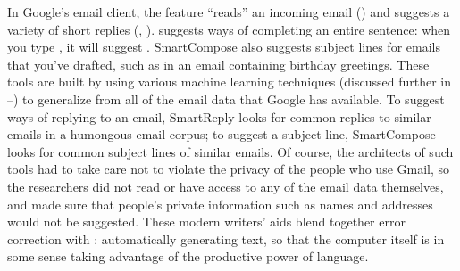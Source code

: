 In Google's email client, the  feature ``reads'' an incoming email () and suggests a variety of short replies (, ).   suggests ways of completing an entire sentence: when you type , it will suggest .  SmartCompose also suggests subject lines for emails that you've drafted, such as  in an email containing birthday greetings.  These tools are built by using various machine learning techniques (discussed further in --)
to generalize from all of the email data that Google has available.  To suggest ways of replying to an email, SmartReply looks for common replies to similar emails in a humongous email corpus; to suggest a subject line, SmartCompose looks for common subject lines of similar emails.  Of course, the architects of such tools had to take care not to violate the privacy of the people who use Gmail, so 
the researchers did not read or have access to any of the email data themselves, and made sure that people's private information such as names and addresses would not be suggested.  
These modern writers' aids blend together error correction with : automatically generating text, so that the computer itself is in some sense taking advantage of the productive power of language. 


